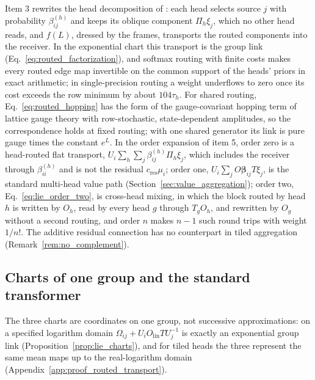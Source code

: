 \documentclass[twoside,11pt]{article}
\begin{document}
Item 3 rewrites the head decomposition of \citet{elhage2021mathematical}: each head selects source $j$ with probability $\beta_{ij}^{(h)}$ and keeps its oblique component $\Pi_h\xi_j$, which no other head reads, and $f(L)$, dressed by the frames, transports the routed components into the receiver. In the exponential chart this transport is the group link (Eq.~\eqref{eq:routed_factorization}), and softmax routing with finite costs makes every routed edge map invertible on the common support of the heads' priors in exact arithmetic; in single-precision routing a weight underflows to zero once its cost exceeds the row minimum by about $104\tau_h$. For shared routing, Eq.~\eqref{eq:routed_hopping} has the form of the gauge-covariant hopping term of lattice gauge theory \citep{Kogut1979RMP,Creutz1983} with row-stochastic, state-dependent amplitudes, so the correspondence holds at fixed routing; with one shared generator its link is pure gauge times the constant $e^{L}$.
In the order expansion of item 5, order zero is a head-routed flat transport, $U_i\sum_h\sum_j\beta_{ij}^{(h)}\Pi_h\xi_j$, which includes the receiver through $\beta_{ii}^{(h)}$ and is not the residual $c_{\mathrm{res}}\mu_i$; order one, $U_i\sum_jO\boldsymbol\beta_{ij}T\xi_j$, is the standard multi-head value path (Section~\ref{sec:value_aggregation}); order two, Eq.~\eqref{eq:lie_order_two}, is cross-head mixing, in which the block routed by head $h$ is written by $O_h$, read by every head $g$ through $T_gO_h$, and rewritten by $O_g$ without a second routing, and order $n$ makes $n-1$ such round trips with weight $1/n!$. The additive residual connection \citep{He2016ResNet} has no counterpart in tiled aggregation (Remark~\ref{rem:no_complement}).

\subsection{Charts of one group and the standard transformer}
\label{sec:lie_charts}

The three charts are coordinates on one group, not successive approximations: on a specified logarithm domain $\Omega_{ij}+U_iO_{\mathrm{lin}}TU_j^{-1}$ is exactly an exponential group link (Proposition~\ref{prop:lie_charts}), and for tiled heads the three represent the same mean maps up to the real-logarithm domain (Appendix~\ref{app:proof_routed_transport}).
\end{document}
